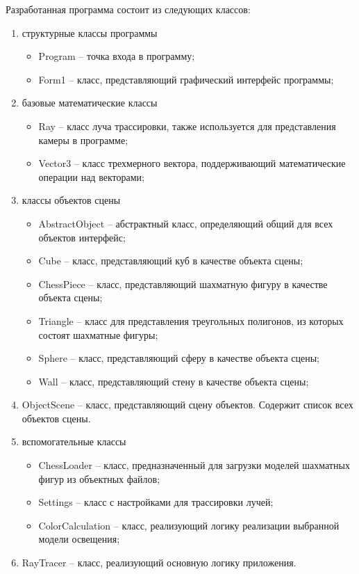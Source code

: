 Разработанная программа состоит из следующих классов:
\begin{enumerate}
	\item структурные классы программы
	\begin{itemize}
		\item Program -- точка входа в программу;
		\item Form1 -- класс, представляющий графический интерфейс программы;
	\end{itemize}
	\item базовые математические классы
	\begin{itemize}
		\item Ray -- класс луча трассировки, также используется для представления камеры в программе;
		\item Vector3 -- класс трехмерного вектора, поддерживающий математические операции над векторами;
	\end{itemize}
	\item классы объектов сцены
	\begin{itemize}
		\item AbstractObject -- абстрактный класс, определяющий общий для всех объектов интерфейс;
		\item Cube -- класс, представляющий куб в качестве объекта сцены;
		\item ChessPiece -- класс, представляющий шахматную фигуру в качестве объекта сцены;
		\item Triangle -- класс для представления треугольных полигонов, из которых состоят шахматные фигуры;
		\item Sphere -- класс, представляющий сферу в качестве объекта сцены;
		\item Wall -- класс, представляющий стену в качестве объекта сцены;
	\end{itemize}
	\item ObjectScene -- класс, представляющий сцену объектов. Содержит список всех объектов сцены.
	\item вспомогательные классы
	\begin{itemize}
		\item ChessLoader -- класс, предназначенный для загрузки моделей шахматных фигур из объектных файлов;
		\item Settings -- класс с настройками для трассировки лучей;
		\item ColorCalculation -- класс, реализующий логику реализации выбранной модели освещения;
	\end{itemize}
	\item RayTracer -- класс, реализующий основную логику приложения.
\end{enumerate}


